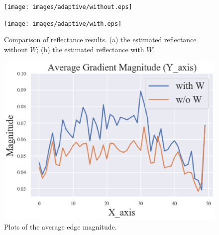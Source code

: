 \begin{figure}[tb]
	\centering
	\begin{minipage}[b]{0.49\hsize}
		\centering
		\texttt{[image: images/adaptive/without.eps]}
		 \label{fig:wo}
	\end{minipage}
	\begin{minipage}[b]{0.49\hsize}
		\centering
		\texttt{[image: images/adaptive/with.eps]}
		 \label{fig:w}
	\end{minipage}
	\caption{Comparison of reflectance results. (a) the estimated reflectance without $W$; (b) the estimated reflectance with $W$.}
	\label{fig:adaptive/effectiveness}
\end{figure}
\begin{figure}[tb]
	\centering
	\includegraphics[width=0.8\hsize]{images/adaptive/graph_edge.eps}
	\caption{Plots of the average edge magnitude.} \label{fig:adaptive/edge_magnitude}
\end{figure}

